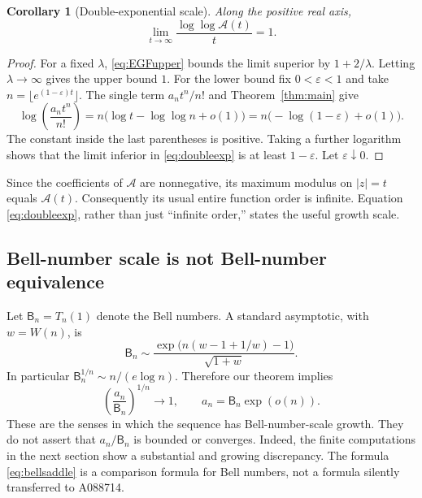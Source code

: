 \documentclass[11pt]{article}
\numberwithin{equation}{section}
\newtheorem{corollary}[theorem]{Corollary}
\theoremstyle{remark}
\newcommand{\eps}{\varepsilon}
\begin{document}
\begin{corollary}[Double-exponential scale]\label{cor:EGF}
Along the positive real axis,
\begin{equation}\label{eq:doubleexp}
 \lim_{t\to\infty}\frac{\log\log\mathcal A(t)}t=1.
\end{equation}
\end{corollary}
\begin{proof}
For a fixed $\lambda$, \eqref{eq:EGFupper} bounds the limit superior by
$1+2/\lambda$. Letting $\lambda\to\infty$ gives the upper bound $1$.
For the lower bound fix $0<\eps<1$ and take
$n=\lfloor e^{(1-\eps)t}\rfloor$. The single term $a_nt^n/n!$ and
Theorem~\ref{thm:main} give
\[
 \log\left(\frac{a_nt^n}{n!}\right)
 =n\bigl(\log t-\log\log n+o(1)\bigr)
 =n\bigl(-\log(1-\eps)+o(1)\bigr).
\]
The constant inside the last parentheses is positive. Taking a further
logarithm shows that the limit inferior in \eqref{eq:doubleexp} is at
least $1-\eps$. Let $\eps\downarrow0$.
\end{proof}
Since the coefficients of $\mathcal A$ are nonnegative, its maximum
modulus on $|z|=t$ equals $\mathcal A(t)$. Consequently its usual entire
function order is infinite. Equation \eqref{eq:doubleexp}, rather than
just ``infinite order,'' states the useful growth scale.

\subsection{Bell-number scale is not Bell-number equivalence}

Let $\mathsf B_n=T_n(1)$ denote the Bell numbers. A standard asymptotic,
with $w=W(n)$, is \cite{dlmf-bell}
\begin{equation}\label{eq:bellsaddle}
 \mathsf B_n\sim
 \frac{\exp\!\bigl(n(w-1+1/w)-1\bigr)}{\sqrt{1+w}}.
\end{equation}
In particular $\mathsf B_n^{1/n}\sim n/(e\log n)$. Therefore our theorem
implies
\begin{equation}\label{eq:bellroot}
 \left(\frac{a_n}{\mathsf B_n}\right)^{1/n}\longrightarrow1,
 \qquad
 a_n=\mathsf B_n\exp(o(n)).
\end{equation}
These are the senses in which the sequence has Bell-number-scale growth.
They do not assert that $a_n/\mathsf B_n$ is bounded or converges. Indeed,
the finite computations in the next section show a substantial and
growing discrepancy. The formula \eqref{eq:bellsaddle} is a comparison
formula for Bell numbers, not a formula silently transferred to A088714.
\end{document}
